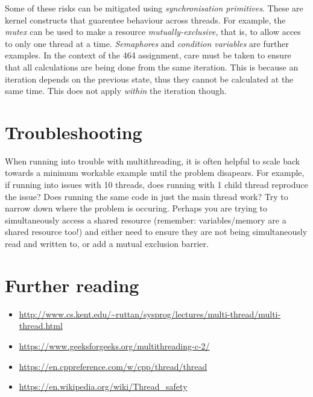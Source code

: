 \documentclass[a4paper,11pt]{article}
\begin{document}
Some of these risks can be mitigated using \emph{synchronisation primitives}.
These are kernel constructs that guarentee behaviour across threads. For
example, the \emph{mutex} can be used to make a resource
\emph{mutually-exclusive}, that is, to allow acces to only one thread at a time.
\emph{Semaphores} and \emph{condition variables} are further examples. In the
context of the 464 assignment, care must be taken to ensure that all
calculations are being done from the same iteration. This is because an
iteration depends on the previous state, thus they cannot be calculated at the
same time. This does not apply \emph{within} the iteration though.


\section{Troubleshooting}

When running into trouble with multithreading, it is often helpful to scale back
towards a minimum workable example until the problem disapears. For example, if
running into issues with 10 threads, does running with 1 child thread reproduce
the issue? Does running the same code in just the main thread work? Try to
narrow down where the problem is occuring. Perhaps you are trying to
simultaneously access a shared resource (remember: variables/memory are a shared
resource too!) and either need to ensure they are not being simultaneously read
and written to, or add a mutual exclusion barrier.

\section{Further reading}

\begin{itemize}
    \item \url{http://www.cs.kent.edu/~ruttan/sysprog/lectures/multi-thread/multi-thread.html}
    \item \url{https://www.geeksforgeeks.org/multithreading-c-2/}
    \item \url{https://en.cppreference.com/w/cpp/thread/thread}
    \item \url{https://en.wikipedia.org/wiki/Thread_safety}
\end{itemize}
\end{document}
